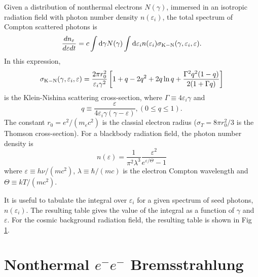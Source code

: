 \documentclass[12pt]{article}
\newcommand{\D}{{\rm d}}
\begin{document}
Given a distribution of nonthermal electrons $N(\gamma)$, immersed
in an isotropic radiation field with photon number density
$n(\varepsilon_i)$, the total spectrum of Compton scattered photons
is
\begin{equation}
\frac{dn_\varepsilon}{d\varepsilon dt} =
c \int \D\gamma N(\gamma) \int \D\varepsilon_i
  n(\varepsilon_i)
  \sigma_{\rm K-N}(\gamma, \varepsilon_i, \varepsilon).
\end{equation}
In this expression,
\begin{equation}
 \sigma_{\rm K-N}(\gamma, \varepsilon_i, \varepsilon) =
\frac{2\pi r_0^2}{\varepsilon_i \gamma^2}
\left[
1 + q - 2q^2 + 2q\ln q +
\frac{\Gamma^2 q^2 (1-q)}{2(1 + \Gamma q)}
\right]
\end{equation}
is the Klein-Nishina scattering cross-section,
where $\Gamma \equiv 4\varepsilon_i\gamma$ and
\begin{equation}
 q \equiv \frac{\varepsilon}
             {4 \varepsilon_i \gamma (\gamma - \varepsilon)},
             (0 \le q \le 1).
\end{equation}
The constant $r_0 = e^2 /(m_ec^2)$ is the classial electron
radius ($\sigma_T = 8\pi r_0^2/3$ is the Thomson cross-section).
For a blackbody radiation field,
the photon number density is
\begin{equation}
  n(\varepsilon) = \frac{1}{\pi^2 \lambda^3}
  \frac{\varepsilon^2}{e^{\varepsilon/\Theta} - 1}
\end{equation}
where $\varepsilon \equiv h\nu/(mc^2)$, $\lambda \equiv \hbar/(mc)$
is the electron Compton wavelength
and $\Theta \equiv kT/(mc^2)$.

It is useful to tabulate the integral over $\varepsilon_i$
for a given spectrum of seed photons, $n(\varepsilon_i)$.
The resulting table gives the value of the integral as a function
of $\gamma$ and $\varepsilon$.
For the cosmic background radiation field, the resulting table
is shown in Fig \ref{ic-fig}.

\begin{figure}
\hbox{\hspace*{-0.25in}}
\caption{}
\label{ic-fig}
\end{figure}

\clearpage
\newpage

\section{Nonthermal $e^{-}e^{-}$ Bremsstrahlung}
\end{document}
